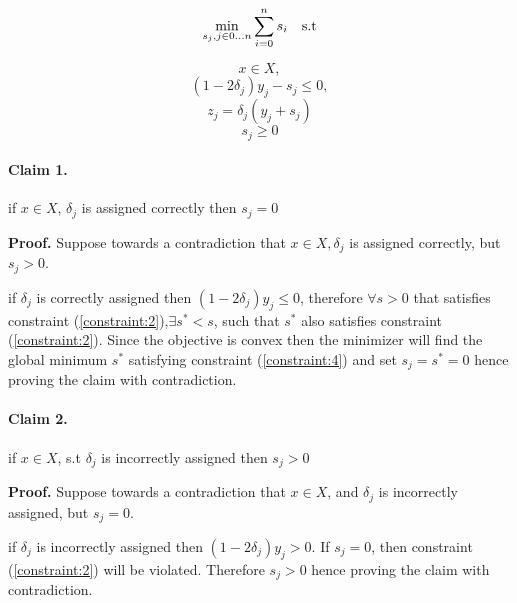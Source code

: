 \documentclass{article}
\begin{document}
$$\min\limits_{s_j,j\in{0\dots n}}\displaystyle\sum_{i=0}^{n}s_i\text{\quad s.t}$$


\begin{equation}\label{constraint:1}
x \in X,
\end{equation}
\begin{equation}\label{constraint:2}
(1-2\delta_j)y_j - s_j \leq 0,
\end{equation}
\begin{equation}\label{constraint:3}
z_j = \delta_j(y_j +s_j)
\end{equation}
\begin{equation}\label{constraint:4}
s_j \geq 0
\end{equation}


\paragraph{Claim 1.} if \forall $x \in X$, $\delta_j$ is assigned correctly then $s_j = 0$

\noindent
\textbf{Proof.}
Suppose towards a contradiction that \forall $x \in X, \delta_j$ is assigned correctly, but $s_j > 0$.

\noindent
if $\delta_j$ is correctly assigned then $(1-2\delta_j)y_j \leq 0$, therefore $\forall  s > 0$ that satisfies constraint (\ref{constraint:2}),$\exists s^* < s$, such that $s^*$ also satisfies constraint (\ref{constraint:2}). Since the objective is convex then the minimizer will find the global minimum $s^*$ satisfying constraint (\ref{constraint:4}) and set $s_j = s^* = 0$ hence proving the claim with contradiction.


\paragraph{Claim 2.} if \exists $x \in X$, s.t $\delta_j$ is incorrectly assigned  then $s_j > 0$

\noindent
\textbf{Proof.}
Suppose towards a contradiction that \exists $x \in X$, and $\delta_j$ is incorrectly assigned, but $s_j = 0$.

\noindent
if $\delta_j$ is incorrectly assigned then $(1-2\delta_j)y_j > 0$. If $s_j = 0$, then constraint (\ref{constraint:2}) will be violated. Therefore $s_j > 0$ hence proving the claim with contradiction.
\end{document}
